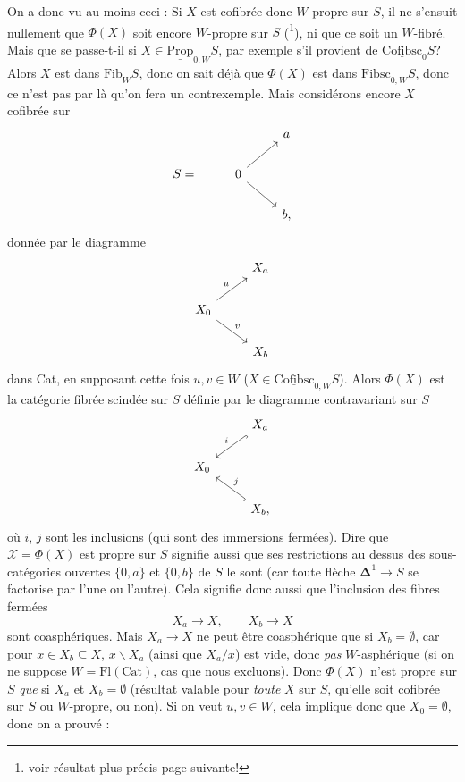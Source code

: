 \documentclass[11pt]{article}
\newcommand{\printedpage}[1]{\marginpar{\footnotesize p.~#1}}
\newcommand{\msp}[1]{\marginpar{\footnotesize [#1]}}
\newcommand{\Fib}{\underline{\mathrm{Fib}}}
\newcommand{\Prop}{\underline{\mathrm{Prop}}}
\newcommand{\Cofibsc}{\underline{\mathrm{Cofibsc}}}
\newcommand{\Fibsc}{\underline{\mathrm{Fibsc}}}
\newcommand{\margbar}{\marginpar{\(\|\)}}
\begin{document}
\printedpage{118}
\msp{page 191}
\margbar On a donc vu au moins ceci : Si $X$ est cofibrée donc $W$-propre sur $S$, il ne s'ensuit nullement que $\Phi(X)$ soit encore $W$-propre sur $S$ (\footnote{voir résultat plus précis page suivante!}), ni que ce soit un $W$-fibré. Mais que se passe-t-il si $X \in \Prop_{0,W}S$, par exemple s'il provient de $\Cofibsc_0 S$? Alors $X$ est dans $\Fib_W S$, donc on sait déjà que $\Phi(X)$ est dans $\Fibsc_{0,W}S$, donc ce n'est pas par là qu'on fera un contrexemple. Mais considérons encore $X$ cofibrée sur
\[
\begin{tikzcd}
 & & a \\
S = & 0 \arrow[ur] \arrow[dr] & \\
 & & b,
\end{tikzcd}
\]
donnée par le diagramme
\[
\begin{tikzcd}
 & X_a \\
X_0 \arrow[ur, "u"] \arrow[dr, "v"] & \\
 & X_b
\end{tikzcd}
\]
dans Cat, en supposant cette fois $u, v \in W$ ($X \in \Cofibsc_{0,W}S$). Alors $\Phi(X)$ est la catégorie fibrée scindée sur $S$ définie par le diagramme contravariant sur $S$
\[
\begin{tikzcd}
 & X_a \arrow[dl, hook, "i"'] \\
X_0 & \\
 & X_b, \arrow[ul, hook, "j"']
\end{tikzcd}
\]
où $i$, $j$ sont les inclusions (qui sont des immersions fermées). Dire que $\mathcal{X} = \Phi(X)$ est propre sur $S$ signifie aussi que ses restrictions au dessus des sous-catégories ouvertes $\{0,a\}$ et $\{0,b\}$ de $S$ le sont (car toute flèche $\mathbf{\Delta}^1 \longrightarrow S$ se factorise par l'une ou l'autre). Cela
\msp{page 192}
signifie donc aussi que l'inclusion des fibres fermées
\[ X_a \longrightarrow X, \qquad X_b \longrightarrow X \]
sont coasphériques. Mais $X_a \longrightarrow X$ ne peut être coasphérique que si $X_b = \emptyset$, car pour $x \in X_b \subseteq X$, $x\backslash X_a$ (ainsi que $X_a/x$) est vide, donc \textit{pas} $W$-asphérique (si on ne suppose $W = \mathrm{Fl}(\mathrm{Cat})$, cas que nous excluons). Donc $\Phi(X)$ n'est propre sur $S$ \textit{que} si $X_a$ et $X_b = \emptyset$ (résultat valable pour \textit{toute} $X$ sur $S$, qu'elle soit cofibrée sur $S$ ou $W$-propre, ou non). Si on veut $u, v \in W$, cela implique donc que $X_0 = \emptyset$, donc on a prouvé :
\end{document}

